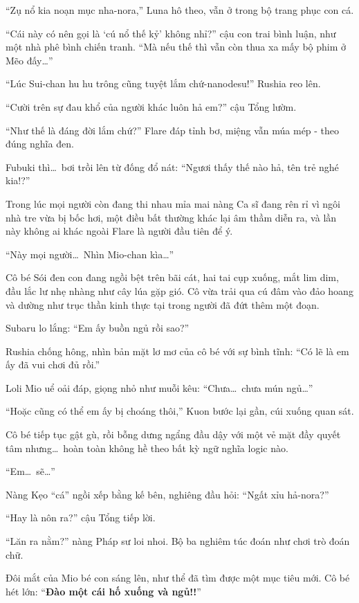 \documentclass[../main.tex]{subfiles}
\begin{document}
``Zụ nổ kia noạn mục nha-nora,'' Luna hô theo, vẫn ở trong bộ trang phục con cá.

``Cái này có nên gọi là `cú nổ thế kỷ' không nhỉ?'' cậu con trai bình luận, như một nhà phê bình chiến tranh. ``Mà nếu thế thì vẫn còn thua xa mấy bộ phim ở Mẽo đấy\dots''

``Lúc Sui-chan hu hu trông cũng tuyệt lắm chứ-nanodesu!'' Rushia reo lên.

``Cười trên sự đau khổ của người khác luôn hả em?'' cậu Tổng lườm.

``Như thế là đáng đời lắm chứ?'' Flare đáp tỉnh bơ, miệng vẫn múa mép - theo đúng nghĩa đen.

Fubuki thì\dots\ bơi trồi lên từ đống đổ nát: ``Ngươi thấy thế nào hả, tên trẻ nghé kia!?''

Trong lúc mọi người còn đang thi nhau mỉa mai nàng Ca sĩ đang rên rỉ vì ngôi nhà tre vừa bị bốc hơi, một điều bất thường khác lại âm thầm diễn ra, và lần này không ai khác ngoài Flare là người đầu tiên để ý.

``Này mọi người\dots\ Nhìn Mio-chan kìa\dots''

Cô bé Sói đen con đang ngồi bệt trên bãi cát, hai tai cụp xuống, mắt lim dim, đầu lắc lư nhẹ nhàng như cây lúa gặp gió. Cô vừa trải qua cú đâm vào đảo hoang và dường như trục thần kinh thực tại trong người đã đứt thêm một đoạn.


Subaru lo lắng: ``Em ấy buồn ngủ rồi sao?''

Rushia chống hông, nhìn bản mặt lơ mơ của cô bé với sự bình tĩnh: ``Có lẽ là em ấy đã vui chơi đủ rồi.''

Loli Mio uể oải đáp, giọng nhỏ như muỗi kêu: ``Chưa\dots\ chưa mún ngủ\dots''

``Hoặc cũng có thể em ấy bị choáng thôi,'' Kuon bước lại gần, cúi xuống quan sát.

Cô bé tiếp tục gật gù, rồi bỗng dưng ngẩng đầu dậy với một vẻ mặt đầy quyết tâm nhưng\dots\ hoàn toàn không hề theo bất kỳ ngữ nghĩa logic nào.

``Em\dots\ sẽ\dots''

Nàng Kẹo ``cá'' ngồi xếp bằng kế bên, nghiêng đầu hỏi: ``Ngất xỉu hả-nora?''

``Hay là nôn ra?'' cậu Tổng tiếp lời.

``Lăn ra nằm?''  nàng Pháp sư loi nhoi. Bộ ba nghiêm túc đoán như chơi trò đoán chữ.

Đôi mắt của Mio bé con sáng lên, như thể đã tìm được một mục tiêu mới. Cô bé hét lớn: ``\textbf{Đào một cái hố xuống và ngủ!!}''
\end{document}
